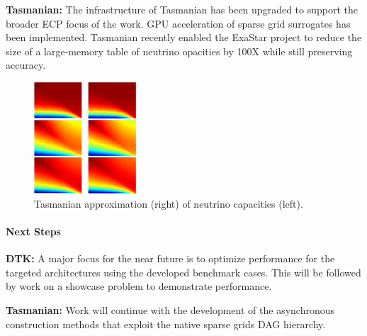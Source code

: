 {\bf Tasmanian:}
The infrastructure of Tasmanian has been upgraded to support
the broader ECP focus of the work.
GPU acceleration of sparse grid surrogates has been
implemented.
Tasmanian recently enabled the ExaStar project
to reduce the size of a large-memory table of neutrino
opacities by 100X while still preserving accuracy.

\begin{figure}[htb]
        \centering
        \includegraphics[width=1.5in]{projects/2.3.3-MathLibs/2.3.3.11-ALExa/tasmanian-gpu}
        \caption{\label{fig:tasmanian-gpu}Tasmanian approximation (right) of neutrino capacities (left).}
\end{figure}


\paragraph{Next Steps}

\indent

{\bf DTK:}
A major focus for the near future is to optimize performance
for the targeted architectures using the developed benchmark
cases.
This will be followed by work on a showcase problem to
demonstrate performance.

{\bf Tasmanian:}
Work will continue with the development of the asynchronous
construction methods that exploit the native sparse grids DAG hierarchy.

